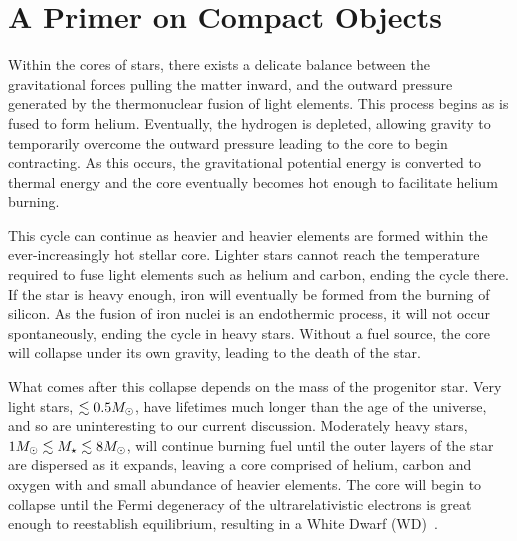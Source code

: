 \graphicspath{{img/chapter_2/}}



\chapter{A Primer on Compact Objects}
\label{chapter:compactobjects}


Within the cores of stars, there exists a delicate balance between the gravitational forces pulling the matter inward, and the outward pressure generated by the thermonuclear fusion of light elements. This process begins as is fused to form helium. Eventually, the hydrogen is depleted, allowing gravity to temporarily overcome the outward pressure leading to the core to begin contracting. As this occurs, the gravitational potential energy is converted to thermal energy and the core eventually becomes hot enough to facilitate helium burning. 

This cycle can continue as heavier and heavier elements are formed within the ever-increasingly hot stellar core. Lighter stars cannot reach the temperature required to fuse light elements such as helium and carbon, ending the cycle there. If the star is heavy enough, iron will eventually be formed from the burning of silicon. As the fusion of iron nuclei is an endothermic process, it will not occur spontaneously, ending the cycle in heavy stars. Without a fuel source, the core will collapse under its own gravity, leading to the death of the star.

What comes after this collapse depends on the mass of the progenitor star. Very light stars, $\lesssim 0.5 M_\odot$, have lifetimes much longer than the age of the universe, and so are uninteresting to our current discussion. Moderately heavy stars, $1M_\odot\lesssim M_\star \lesssim 8M_\odot$, will continue burning fuel until the outer layers of the star are dispersed as it expands, leaving a core comprised of helium, carbon and oxygen with and small abundance of heavier elements. The core will begin to collapse until the Fermi degeneracy of the ultrarelativistic electrons is great enough to reestablish equilibrium, resulting in a White Dwarf (WD)~\cite{Jackson:2004vt_Compactobjectseveryone}.

